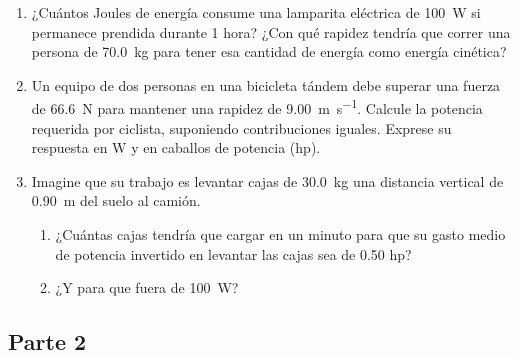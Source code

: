 \documentclass[Física - Práctica.root.tex]{subfiles}
\begin{document}
\begin{enumerate}
\begin{multicols}{2}
        \end{multicols}

  \item ¿Cuántos Joules de energía consume una lamparita eléctrica de \SI{100}{\watt} si permanece
        prendida durante 1 hora? ¿Con qué rapidez tendría que correr una persona de \SI{70,0}{\kilo\gram} para
        tener esa cantidad de energía como energía cinética?

  \item Un equipo de dos personas en una bicicleta tándem debe superar una fuerza de \SI{66,6}{\newton}
        para mantener una rapidez de \SI[per-mode=fraction]{9,00}{\meter\per\second}. Calcule la potencia requerida por ciclista,
        suponiendo contribuciones iguales. Exprese su respuesta en \si{\watt} y en caballos de potencia (hp).

  \item Imagine que su trabajo es levantar cajas de \SI{30,0}{\kilo\gram} una distancia vertical de \SI{0,90}{\meter} del
        suelo al camión.
        \begin{enumerate}
          \item ¿Cuántas cajas tendría que cargar en un minuto para que su gasto medio de potencia
                invertido en levantar las cajas sea de \num{0,50} hp?
          \item ¿Y para que fuera de \SI{100}{\watt}?
        \end{enumerate}
\end{enumerate}

\subsection{Parte 2}
\begin{enumerate}

\end{enumerate}
\end{document}
